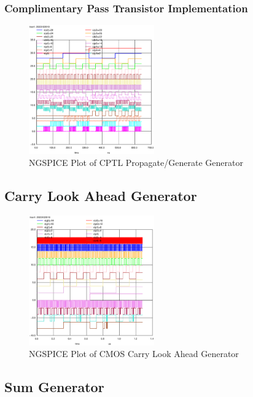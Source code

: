 \documentclass[conference]{IEEEtran}
\begin{document}
\subsubsection{Complimentary Pass Transistor Implementation}

\begin{figure}[H]
    \centering
    \includegraphics[width=0.48\textwidth]{images/pg_gen_optimized_tran.eps}
    \caption{NGSPICE Plot of CPTL Propagate/Generate Generator}
\end{figure}

\subsection{Carry Look Ahead Generator}

\begin{figure}[H]
    \centering
    \includegraphics[width=0.48\textwidth]{images/cla_gen_cmos_tran.eps}
    \caption{NGSPICE Plot of CMOS Carry Look Ahead Generator}
\end{figure}

\subsection{Sum Generator}
\end{document}
